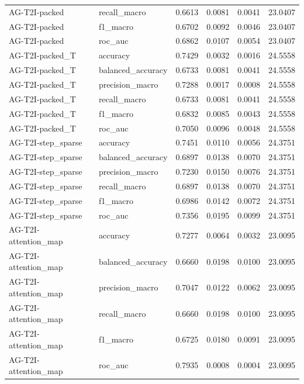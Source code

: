 \begin{tabular}{llrrrr}
AG-T2I-packed & recall_macro & 0.6613 & 0.0081 & 0.0041 & 23.0407 \\
AG-T2I-packed & f1_macro & 0.6702 & 0.0092 & 0.0046 & 23.0407 \\
AG-T2I-packed & roc_auc & 0.6862 & 0.0107 & 0.0054 & 23.0407 \\
AG-T2I-packed_T & accuracy & 0.7429 & 0.0032 & 0.0016 & 24.5558 \\
AG-T2I-packed_T & balanced_accuracy & 0.6733 & 0.0081 & 0.0041 & 24.5558 \\
AG-T2I-packed_T & precision_macro & 0.7288 & 0.0017 & 0.0008 & 24.5558 \\
AG-T2I-packed_T & recall_macro & 0.6733 & 0.0081 & 0.0041 & 24.5558 \\
AG-T2I-packed_T & f1_macro & 0.6832 & 0.0085 & 0.0043 & 24.5558 \\
AG-T2I-packed_T & roc_auc & 0.7050 & 0.0096 & 0.0048 & 24.5558 \\
AG-T2I-step_sparse & accuracy & 0.7451 & 0.0110 & 0.0056 & 24.3751 \\
AG-T2I-step_sparse & balanced_accuracy & 0.6897 & 0.0138 & 0.0070 & 24.3751 \\
AG-T2I-step_sparse & precision_macro & 0.7230 & 0.0150 & 0.0076 & 24.3751 \\
AG-T2I-step_sparse & recall_macro & 0.6897 & 0.0138 & 0.0070 & 24.3751 \\
AG-T2I-step_sparse & f1_macro & 0.6986 & 0.0142 & 0.0072 & 24.3751 \\
AG-T2I-step_sparse & roc_auc & 0.7356 & 0.0195 & 0.0099 & 24.3751 \\
AG-T2I-attention_map & accuracy & 0.7277 & 0.0064 & 0.0032 & 23.0095 \\
AG-T2I-attention_map & balanced_accuracy & 0.6660 & 0.0198 & 0.0100 & 23.0095 \\
AG-T2I-attention_map & precision_macro & 0.7047 & 0.0122 & 0.0062 & 23.0095 \\
AG-T2I-attention_map & recall_macro & 0.6660 & 0.0198 & 0.0100 & 23.0095 \\
AG-T2I-attention_map & f1_macro & 0.6725 & 0.0180 & 0.0091 & 23.0095 \\
AG-T2I-attention_map & roc_auc & 0.7935 & 0.0008 & 0.0004 & 23.0095 \\
\bottomrule
\end{tabular}
